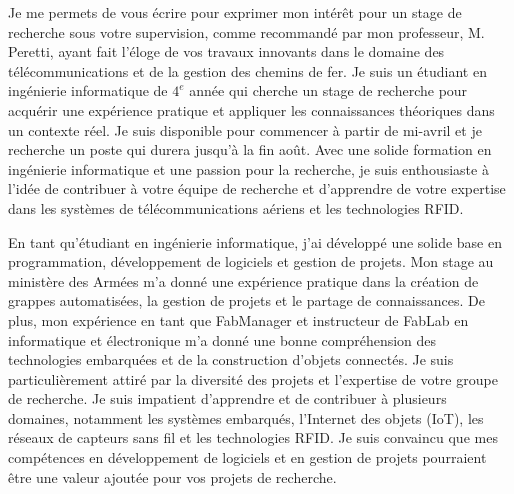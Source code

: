 \documentclass[11pt, a4paper]{awesome-cv}
\begin{document}
\hspace{8cm}\makeclheader[L]


\makelettertitle

\begin{cvletter}
Je me permets de vous écrire pour exprimer mon intérêt pour un stage de recherche sous votre supervision, comme recommandé par mon professeur, M. Peretti, ayant fait l'éloge de vos travaux innovants dans le domaine des télécommunications et de la gestion des chemins de fer. Je suis un étudiant en ingénierie informatique de $4^{e}$ année qui cherche un stage de recherche pour acquérir une expérience pratique et appliquer les connaissances théoriques dans un contexte réel. Je suis disponible pour commencer à partir de mi-avril et je recherche un poste qui durera jusqu'à la fin août. Avec une solide formation en ingénierie informatique et une passion pour la recherche, je suis enthousiaste à l'idée de contribuer à votre équipe de recherche et d'apprendre de votre expertise dans les systèmes de télécommunications aériens et les technologies RFID.

En tant qu'étudiant en ingénierie informatique, j'ai développé une solide base en programmation, développement de logiciels et gestion de projets. Mon stage au ministère des Armées m'a donné une expérience pratique dans la création de grappes automatisées, la gestion de projets et le partage de connaissances. De plus, mon expérience en tant que FabManager et instructeur de FabLab en informatique et électronique m'a donné une bonne compréhension des technologies embarquées et de la construction d'objets connectés. Je suis particulièrement attiré par la diversité des projets et l'expertise de votre groupe de recherche. Je suis impatient d'apprendre et de contribuer à plusieurs domaines, notamment les systèmes embarqués, l'Internet des objets (IoT), les réseaux de capteurs sans fil et les technologies RFID. Je suis convaincu que mes compétences en développement de logiciels et en gestion de projets pourraient être une valeur ajoutée pour vos projets de recherche.


\end{cvletter}
\end{document}
